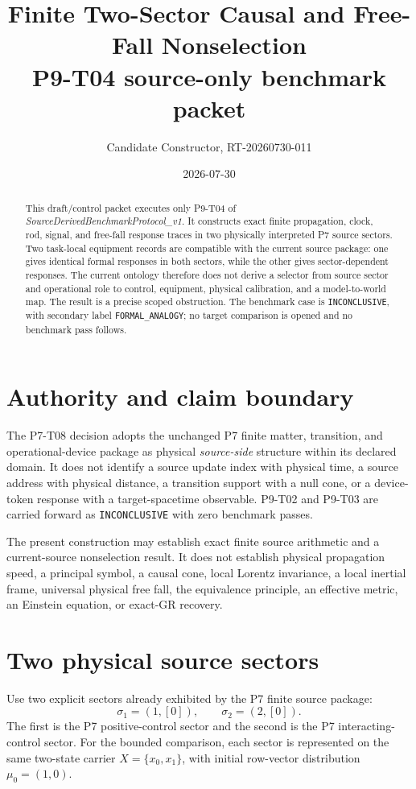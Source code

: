 \documentclass[11pt]{article}
\title{Finite Two-Sector Causal and Free-Fall Nonselection\\
\large P9-T04 source-only benchmark packet}
\author{Candidate Constructor, RT-20260730-011}
\date{2026-07-30}
\begin{document}
\maketitle

\begin{abstract}
This draft/control packet executes only P9-T04 of
\emph{SourceDerivedBenchmarkProtocol\_v1}.  It constructs exact finite
propagation, clock, rod, signal, and free-fall response traces in two
physically interpreted P7 source sectors.  Two task-local equipment records
are compatible with the current source package: one gives identical formal
responses in both sectors, while the other gives sector-dependent responses.
The current ontology therefore does not derive a selector from source sector
and operational role to control, equipment, physical calibration, and a
model-to-world map.  The result is a precise scoped obstruction.  The
benchmark case is \texttt{INCONCLUSIVE}, with secondary label
\texttt{FORMAL\_ANALOGY}; no target comparison is opened and no benchmark
pass follows.
\end{abstract}

\section{Authority and claim boundary}

The P7-T08 decision adopts the unchanged P7 finite matter, transition, and
operational-device package as physical \emph{source-side} structure within its
declared domain.  It does not identify a source update index with physical
time, a source address with physical distance, a transition support with a
null cone, or a device-token response with a target-spacetime observable.
P9-T02 and P9-T03 are carried forward as \texttt{INCONCLUSIVE} with zero
benchmark passes.

The present construction may establish exact finite source arithmetic and a
current-source nonselection result.  It does not establish physical
propagation speed, a principal symbol, a causal cone, local Lorentz
invariance, a local inertial frame, universal physical free fall, the
equivalence principle, an effective metric, an Einstein equation, or
exact-GR recovery.

\section{Two physical source sectors}

Use two explicit sectors already exhibited by the P7 finite source package:
\[
  \sigma_1=(1,[0]),\qquad \sigma_2=(2,[0]).
\]
The first is the P7 positive-control sector and the second is the P7
interacting-control sector.  For the bounded comparison, each sector is
represented on the same two-state carrier \(X=\{x_0,x_1\}\), with initial
row-vector distribution \(\mu_0=(1,0)\).
\end{document}
